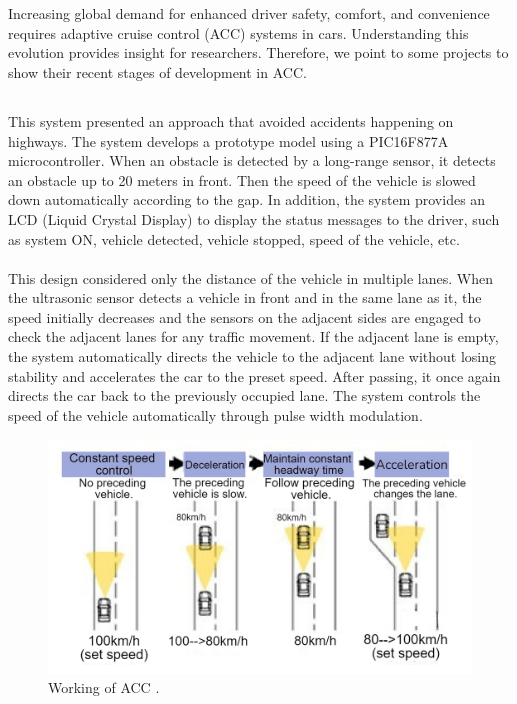 \documentclass[12pt,a4paper]{report}
\begin{document}
\section{\fontsize{12}{12}\selectfont{Related Work}}
Increasing global demand for enhanced driver safety, comfort, and convenience requires adaptive cruise control (ACC) systems in cars. Understanding this evolution provides insight for researchers. Therefore, we point to some projects to show their recent stages of development in ACC.

\subsection{\fontsize{12}{12}\selectfont{Fully Automated Cruise Control System Using Ultrasonic Sensor}}
This system presented an approach that avoided accidents happening on highways. The system develops a prototype model using a PIC16F877A microcontroller. When an obstacle is detected by a long-range sensor, it detects an obstacle up to 20 meters in front. Then the speed of the vehicle is slowed down automatically according to the gap. In addition, the system provides an LCD (Liquid Crystal Display) to display the status messages to the driver, such as system ON, vehicle detected, vehicle stopped, speed of the vehicle, etc.
\\\\
This design considered only the distance of the vehicle in multiple lanes. When the ultrasonic sensor detects a vehicle in front and in the same lane as it, the speed initially decreases and the sensors on the adjacent sides are engaged to check the adjacent lanes for any traffic movement. If the adjacent lane is empty, the system automatically directs the vehicle to the adjacent lane without losing stability and accelerates the car to the preset speed. After passing, it once again directs the car back to the previously occupied lane. The system controls the speed of the vehicle automatically through pulse width modulation\cite{Automated}.
\\
\begin{figure}[h]
    \centering
    \graphicspath{ {./images/} }
    \includegraphics[width=1\textwidth]{Working of ACC.jpg}
    \caption{Working of ACC \cite{Automated}.}
    \label{fig:Working of ACC}    
\end{figure}
\\
\end{document}
